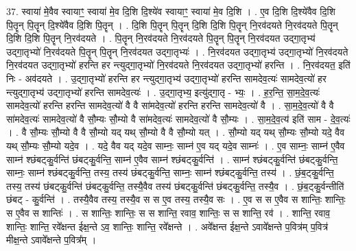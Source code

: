 \documentclass[17pt]{extarticle}
\begin{document}
37. स्वाया॑ मे॒वैव स्वायाꣳ॒॒ स्वाया॑ मे॒व दि॒शि दि॒श्ये॑व स्वायाꣳ॒॒ स्वाया॑ मे॒व दि॒शि । . ए॒व दि॒शि दि॒श्ये॑वैव दि॒शि पि॒तॄन् पि॒तॄन् दि॒श्ये॑वैव दि॒शि पि॒तॄन् । . दि॒शि पि॒तॄन् पि॒तॄन् दि॒शि दि॒शि पि॒तॄन् नि॒रव॑दयते नि॒रव॑दयते पि॒तॄन् दि॒शि दि॒शि पि॒तॄन् नि॒रव॑दयते । . पि॒तॄन् नि॒रव॑दयते नि॒रव॑दयते पि॒तॄन् पि॒तॄन् नि॒रव॑दयत उद्‌गा॒तृभ्य॑ उद्‌गा॒तृभ्यो॑ नि॒रव॑दयते पि॒तॄन् पि॒तॄन् नि॒रव॑दयत उद्‌गा॒तृभ्यः॑ । . नि॒रव॑दयत उद्‌गा॒तृभ्य॑ उद्‌गा॒तृभ्यो॑ नि॒रव॑दयते नि॒रव॑दयत उद्‌गा॒तृभ्यो॑ हरन्ति हर
न्त्युद्‌गा॒तृभ्यो॑ नि॒रव॑दयते नि॒रव॑दयत उद्‌गा॒तृभ्यो॑ हरन्ति । . नि॒रव॑दयत॒ इति॑ निः - अव॑दयते । . उ॒द्‌गा॒तृभ्यो॑ हरन्ति हर न्त्युद्‌गा॒तृभ्य॑ उद्‌गा॒तृभ्यो॑ हरन्ति सामदेव॒त्यः॑ सामदेव॒त्यो॑ हर
न्त्युद्‌गा॒तृभ्य॑ उद्‌गा॒तृभ्यो॑ हरन्ति सामदेव॒त्यः॑ । . उ॒द्‌गा॒तृभ्य॒ इत्यु॑द्‌गा॒तृ - भ्यः॒ । . ह॒र॒न्ति॒ सा॒म॒दे॒व॒त्यः॑ सामदेव॒त्यो॑ हरन्ति हरन्ति सामदेव॒त्यो॑ वै वै सा॑मदेव॒त्यो॑ हरन्ति हरन्ति सामदेव॒त्यो॑ वै । . सा॒म॒दे॒व॒त्यो॑ वै वै सा॑मदेव॒त्यः॑ सामदेव॒त्यो॑ वै सौ॒म्यः सौ॒म्यो वै सा॑मदेव॒त्यः॑ सामदेव॒त्यो॑ वै सौ॒म्यः । . सा॒म॒दे॒व॒त्य॑ इति॑ साम - दे॒व॒त्यः॑ । . वै सौ॒म्यः सौ॒म्यो वै वै सौ॒म्यो यद् यथ् सौ॒म्यो वै वै सौ॒म्यो यत् । . सौ॒म्यो यद् यथ् सौ॒म्यः सौ॒म्यो यदे॒ वैव यथ् सौ॒म्यः सौ॒म्यो यदे॒व । . यदे॒ वैव यद् यदे॒व साम्नः॒ साम्न॑ ए॒व यद् यदे॒व साम्नः॑ । . ए॒व साम्नः॒ साम्न॑ ए॒वैव साम्न॑ श्छंबट्कु॒र्वन्ति॑ छंबट्कु॒र्वन्ति॒ साम्न॑ ए॒वैव साम्न॑ श्छंबट्कु॒र्वन्ति॑ । . साम्न॑ श्छंबट्कु॒र्वन्ति॑ छंबट्कु॒र्वन्ति॒ साम्नः॒ साम्न॑ श्छंबट्कु॒र्वन्ति॒ तस्य॒ तस्य॑ छंबट्कु॒र्वन्ति॒ साम्नः॒ साम्न॑ श्छंबट्कु॒र्वन्ति॒ तस्य॑ । . छं॒ब॒ट्कु॒र्वन्ति॒ तस्य॒ तस्य॑ छंबट्कु॒र्वन्ति॑ छंबट्कु॒र्वन्ति॒ तस्यै॒वैव तस्य॑ छंबट्कु॒र्वन्ति॑ छंबट्कु॒र्वन्ति॒ तस्यै॒व । . छं॒ब॒ट्कु॒र्वन्तीति॑ छंबट् - कु॒र्वन्ति॑ । . तस्यै॒वैव तस्य॒ तस्यै॒व स स ए॒व तस्य॒ तस्यै॒व सः । . ए॒व स स ए॒वैव स शान्तिः॒ शान्तिः॒ स ए॒वैव स शान्तिः॑ । . स शान्तिः॒ शान्तिः॒ स स शान्ति॒ रवाव॒ शान्तिः॒ स स शान्ति॒ रव॑ । . शान्ति॒ रवाव॒ शान्तिः॒ शान्ति॒ रवे᳚क्षन्त ईक्ष॒न्ते ऽव॒ शान्तिः॒ शान्ति॒ रवे᳚क्षन्ते । . अवे᳚क्षन्त ईक्ष॒न्ते ऽवावे᳚क्षन्ते प॒वित्र॑म् प॒वित्र॑ मीक्ष॒न्ते ऽवावे᳚क्षन्ते प॒वित्र᳚म् । \newline
\pagebreak
{}
\end{document}
